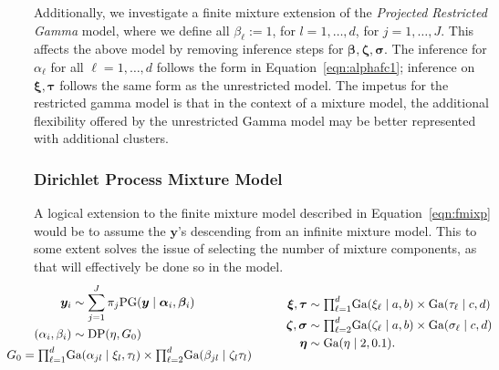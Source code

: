 Additionally, we investigate a finite mixture extension of the \emph{Projected Restricted Gamma} model,
  where we define all $\beta_{\ell} := 1$, for $l = 1,\ldots,d$, for $j = 1,\ldots,J$.  This affects the above
  model by removing inference steps for $\bm{ \beta},\bm{ \zeta},\bm{ \sigma}$.  The inference for
  $\alpha_{\ell}$ for all $\ell = 1,\ldots,d$ follows the form in Equation~\ref{eqn:alphafc1}; inference on
  $\bm{ \xi,\tau}$ follows the same form as the unrestricted model.  The impetus for the restricted
  gamma model is that in the context of a mixture model, the additional flexibility offered by the
  unrestricted Gamma model may be better represented with additional clusters.

\subsubsection{Dirichlet Process Mixture Model}
A logical extension to the finite mixture model described in Equation~\ref{eqn:fmixp} would be to assume the
  $\bm{ y}$'s descending from an infinite mixture model.  This to some extent solves the issue of
  selecting the number of mixture components, as that will effectively be done so in the model.
  \begin{equation}
    \label{eqn:infmixp}
    \begin{aligned}
      \bm{ y}_i &\sim \sum_{j = 1}^J\pi_j\text{PG}\left(\bm{ y}\mid \bm{ \alpha}_i, \bm{ \beta}_i\right)\\
      (\alpha_i,\beta_i) &\sim \text{DP}\left(\eta, G_0\right)\\
      &~\hspace{-2cm}G_0 = {\textstyle\prod}_{\ell = 1}^d\text{Ga}\left(\alpha_{jl}\mid\xi_{l},\tau_{l}\right)
                    \times{\textstyle\prod}_{\ell = 2}^d\text{Ga}\left(\beta_{jl}\mid\zeta_{l}\tau_{l}\right)
    \end{aligned}
    \hspace{1cm}
    \begin{aligned}
      \bm{ \xi},\bm{ \tau} &\sim {\textstyle \prod}_{\ell = 1}^d \text{Ga}(\xi_{\ell}\mid a,b)\times \text{Ga}(\tau_{\ell}\mid c,d)\\
      \bm{ \zeta},\bm{\sigma} &\sim {\textstyle\prod}_{\ell = 2}^d\text{Ga}(\zeta_{\ell} \mid a,b)\times \text{Ga}(\sigma_{\ell}\mid c,d)\\
      \bm{ \eta} &\sim \text{Ga}(\eta \mid 2, 0.1).
    \end{aligned}
  \end{equation}
